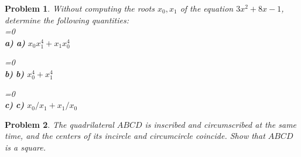 \documentclass[a4paper,12pt]{article}
\theoremstyle{perfect}
\newtheorem{prb}{Problem}
\newcommand{\varline}{0}
\renewcommand\part[1]{
\ifnum\pdfstrcmp{\varline}{1}=0
    \vspace{.10in}\textbf{\\#1)}
  \else
    \textbf{#1)}
  \fi\renewcommand{\varline}{1}}
\begin{document}
\begin{prb}
Without computing the roots $x_0, x_1$ of the equation $3x^2+8x-1$, determine the following quantities:\\
\part{a} $x_0x_1^4 + x_1x_0^4$
\part{b} $x_0^4 + x_1^4$
\part{c} $x_0/x_1+x_1/x_0$
\end{prb}

\begin{prb}
The quadrilateral $ABCD$ is inscribed and circumscribed at the same time, and the centers of its incircle and circumcircle coincide. Show that $ABCD$ is a square.
\end{prb}
\end{document}
